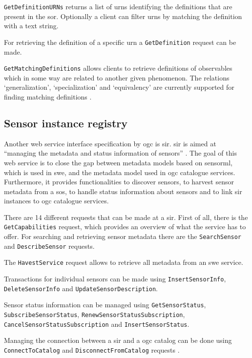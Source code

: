 \texttt{GetDefinitionURNs} returns a list of \acp{urn} identifying the definitions that are present in the \ac{sor}. Optionally a client can filter \acp{urn} by matching the definition with a text string. 

For retrieving the definition of a specific \ac{urn} a \texttt{GetDefinition} request can be made. 

\texttt{GetMatchingDefinitions} allows clients to retrieve definitions of observables which in some way are related to another given phenomenon. The relations `generalization', `specialization' and `equivalency' are currently supported for finding matching definitions \citep{SW:OGC4}.   

\subsection{Sensor instance registry}
Another web service interface specification by \ac{ogc} is \ac{sir}. \ac{sir} is aimed at \enquote{managing the metadata and status information of sensors} \cite[p. xii]{SW:OGC3}. The goal of this web service is to close the gap between metadata models based on \ac{sensorml}, which is used in \ac{swe}, and the metadata model used in \ac{ogc} catalogue services. Furthermore, it provides functionalities to discover sensors, to harvest sensor metadata from a \ac{sos}, to handle status information about sensors and to link \ac{sir} instances to \ac{ogc} catalogue services. 

\begin{sloppypar}
There are 14 different requests that can be made at a \ac{sir}. First of all, there is the \texttt{GetCapabilities} request, which provides an overview of what the service has to offer. For searching and retrieving sensor metadata there are the \texttt{SearchSensor} and \texttt{DescribeSensor} requests. 

The \texttt{HavestService} request allows to retrieve all metadata from an \ac{swe} service. 

Transactions for individual sensors can be made using \texttt{InsertSensorInfo}, \texttt{DeleteSensorInfo}  and \texttt{UpdateSensorDescription}. 

Sensor status information can be managed using \texttt{GetSensorStatus}, \texttt{SubscribeSensorStatus}, \texttt{RenewSensorStatusSubscription}, \texttt{CancelSensorStatusSubscription} and \texttt{InsertSensorStatus}. 

Managing the connection between a \ac{sir} and a \ac{ogc} catalog can be done using \texttt{ConnectToCatalog} and \texttt{DisconnectFromCatalog} requests \citep{SW:OGC3}.
\end{sloppypar}


